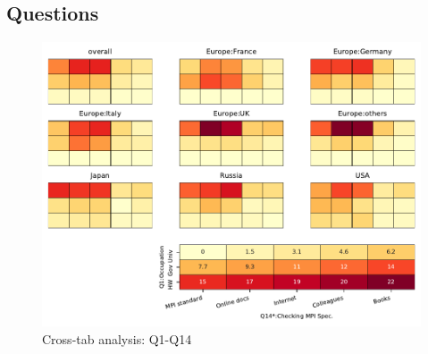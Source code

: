 
\subsection{Questions}


\begin{figure}
\begin{center}
\includegraphics[width=12cm]{../pdfs/Q1-Q14.pdf}
\caption{Cross-tab analysis: Q1-Q14}
\label{fig:Q1-Q14}
\end{center}
\end{figure}
